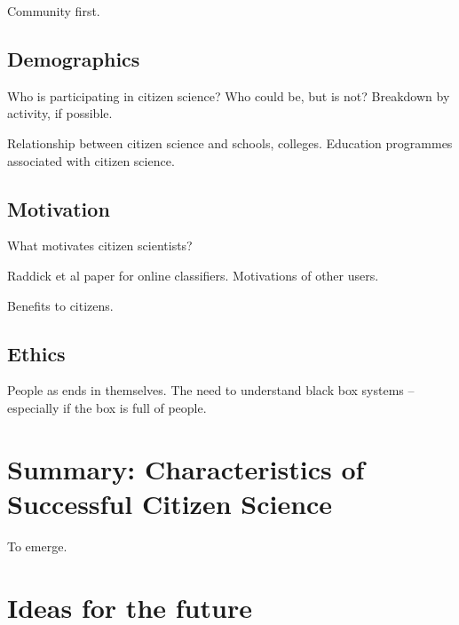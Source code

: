 \documentclass{ar2e}
\begin{document}
Community first.


\subsection{Demographics}
\label{sec:crowd:demographics}

Who is participating in citizen science? Who could be, but is not?
Breakdown by activity, if possible.

Relationship between citizen science and schools, colleges. Education programmes
associated with citizen science.


\subsection{Motivation}
\label{sec:crowd:motive}

What motivates citizen scientists?

Raddick et al paper for online classifiers. Motivations of other users. 

Benefits to citizens. 


\subsection{Ethics}
\label{sec:crowd:ethics}

People as ends in themselves. The need to understand black box systems --
especially if the box is full of people. 



\section{Summary: Characteristics of Successful Citizen Science}
\label{sec:summary}

To emerge.



\section{Ideas for the future}
\label{sec:future}
\end{document}
